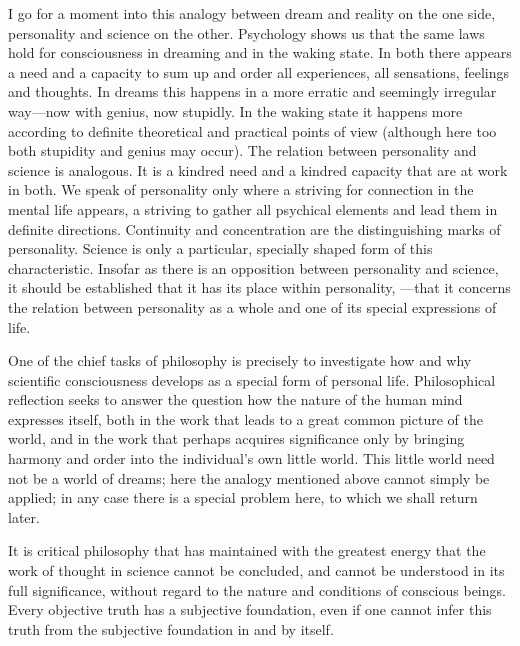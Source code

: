 \documentclass[12pt]{article}
\newcommand{\opage}[1]{\marginnote{\footnotesize\textit{[#1]}}}
\begin{document}
I go for a moment into this analogy between dream and reality on the one side,
personality and science on the other. Psychology shows us that the same laws
hold for consciousness in dreaming and in the waking state. In both there
appears a need and a capacity to sum up and order all experiences, all
sensations, feelings and thoughts. In dreams this happens in a more erratic and
seemingly irregular way---now with genius, now stupidly. In the waking state it
happens more according to
\opage{9}%
definite theoretical and practical points of view (although here too both
stupidity and genius may occur). The relation between personality and science
is analogous. It is a kindred need and a kindred capacity that are at work in
both. We speak of personality only where a striving for connection in the
mental life appears, a striving to gather all psychical elements and lead them
in definite directions. Continuity and concentration are the distinguishing
marks of personality. Science is only a particular, specially shaped form of
this characteristic. Insofar as there is an opposition between personality and
science, it should be established that it has its place within personality,
---that it concerns the relation between personality as a whole and one of its
special expressions of life.

One of the chief tasks of philosophy is precisely to investigate how and why
scientific consciousness develops as a special form of personal life.
Philosophical reflection seeks to answer the question how the nature of the
human mind expresses itself, both in the work that leads to a great common
picture of the world,
\opage{10}%
and in the work that perhaps acquires significance only by bringing harmony and
order into the individual's own little world. This little world need not be a
world of dreams; here the analogy mentioned above cannot simply be applied; in
any case there is a special problem here, to which we shall return later.

It is critical philosophy that has maintained with the greatest energy that the
work of thought in science cannot be concluded, and cannot be understood in its
full significance, without regard to the nature and conditions of conscious
beings. Every objective truth has a subjective foundation, even if one cannot
infer this truth from the subjective foundation in and by itself.
\end{document}

